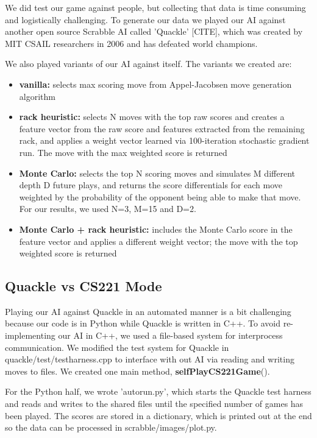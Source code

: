 \documentclass[12pt]{article}
\begin{document}
We did test our game against people, but collecting that data is time
consuming and logistically challenging. To generate our data we played
our AI against another open source Scrabble AI called 'Quackle'
[CITE], which was created by MIT CSAIL researchers in 2006 and has
defeated world champions.

We also played variants of our AI against itself. The variants we
created are:
\begin{itemize}
\item \textbf{vanilla:} selects max scoring move from Appel-Jacobsen
  move generation algorithm
\item \textbf{rack heuristic:} selects N moves with the top raw scores
  and creates a feature vector from the raw score and features
  extracted from the remaining rack, and applies a weight vector
  learned via 100-iteration stochastic gradient run. The move with the
  max weighted score is returned
\item \textbf{Monte Carlo:} selects the top N scoring moves and
  simulates M different depth D future plays, and returns the score
  differentials for each move weighted by the probability of the
  opponent being able to make that move. For our results, we used N=3,
  M=15 and D=2.
\item \textbf{Monte Carlo + rack heuristic:} includes the Monte Carlo
  score in the feature vector and applies a different weight vector;
  the move with the top weighted score is returned
\end{itemize}

\subsection*{Quackle vs CS221 Mode}
Playing our AI against Quackle in an automated manner is a bit
challenging because our code is in Python while Quackle is written in
C++. To avoid re-implementing our AI in C++, we used a file-based
system for interprocess communication. We modified the test system for
Quackle in quackle/test/testharness.cpp to interface with out AI via
reading and writing moves to files. We created one main method,
\textbf{selfPlayCS221Game}().

For the Python half, we wrote 'autorun.py', which starts the Quackle
test harness and reads and writes to the shared files until the
specified number of games has been played. The scores are stored in a
dictionary, which is printed out at the end so the data can be
processed in scrabble/images/plot.py.
\end{document}
